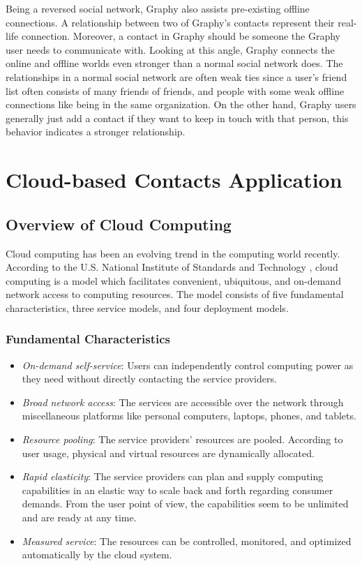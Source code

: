 Being a reversed social network, Graphy also assists pre-existing offline connections. A relationship between two of Graphy's contacts represent their real-life connection. Moreover, a contact in Graphy should be someone the Graphy user needs to communicate with. Looking at this angle, Graphy connects the online and offline worlds even stronger than a normal social network does. The relationships in a normal social network are often weak ties \cite{boyd2010social} since a user's friend list often consists of many friends of friends, and people with some weak offline connections like being in the same organization. On the other hand, Graphy users generally just add a contact if they want to keep in touch with that person, this behavior indicates a stronger relationship.

\section{Cloud-based Contacts Application}\label{cloudcontact}
\subsection{Overview of Cloud Computing}
Cloud computing has been an evolving trend in the computing world recently. According to the U.S. National Institute of Standards and Technology \cite{mell2011nist}, cloud computing is a model which facilitates convenient, ubiquitous, and on-demand network access to computing resources. The model consists of five fundamental characteristics, three service models, and four deployment models.

\subsubsection{Fundamental Characteristics}

\begin{itemize}
    \item \textit{On-demand self-service}: Users can independently control computing power as they need without directly contacting the service providers.
    \item \textit{Broad network access}: The services are accessible over the network through miscellaneous platforms like personal computers, laptops, phones, and tablets.
    \item \textit{Resource pooling}: The service providers' resources are pooled. According to user usage, physical and virtual resources are dynamically allocated.
    \item \textit{Rapid elasticity}: The service providers can plan and supply computing capabilities in an elastic way to scale back and forth regarding consumer demands. From the user point of view, the capabilities seem to be unlimited and are ready at any time.
    \item \textit{Measured service}: The resources can be controlled, monitored, and optimized automatically by the cloud system.
\end{itemize}

